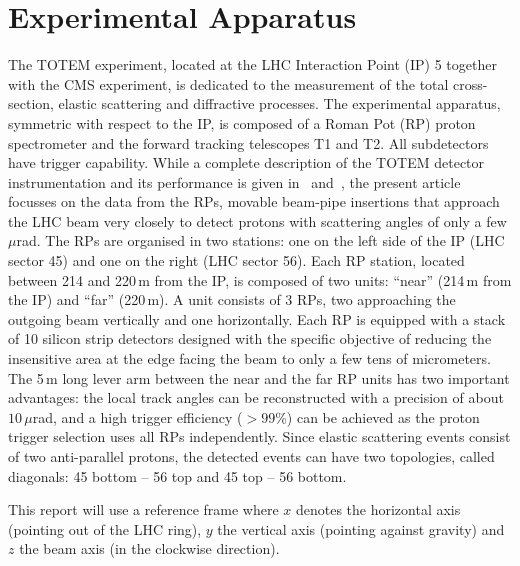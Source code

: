 \section{Experimental Apparatus}
\label{sec:exp apparatus}

The TOTEM experiment, located at the LHC Interaction Point (IP) 5 together with
the CMS experiment, is dedicated to the measurement of the total 
cross-section, elastic scattering
and diffractive processes. The experimental
apparatus, symmetric with respect to the IP, is 
composed of a Roman Pot (RP) proton spectrometer and the forward tracking 
telescopes T1 and T2. All subdetectors have trigger capability. 
While a complete description of the TOTEM detector instrumentation 
and its performance is given in~\cite{totem-jinst} and~\cite{totem-ijmp}, 
the present article focusses on the data from the RPs, movable beam-pipe
insertions that approach the LHC beam very closely to detect protons with
scattering angles of only a few $\mu$rad. 
The RPs are organised in two stations: one on the left side of the IP 
(LHC sector 45) and one on the right (LHC sector 56).
Each RP station, located between 214 and 220\,m from the IP, is composed of two 
units: ``near'' (214\,m from the IP) and ``far'' (220\,m). 
A unit consists of 3 RPs, two
approaching the outgoing beam vertically and one horizontally.
Each RP is equipped with a stack of 10 silicon
strip detectors designed with the specific objective of
reducing the insensitive area at the edge facing the beam
to only a few tens of micrometers. The 5\,m long lever arm 
between the near and the far RP units has two important
advantages: the local track angles can be reconstructed
with a precision of about $10\,\mu$rad, and a high trigger efficiency
($> 99$\%) can be achieved as the proton trigger selection
uses all RPs independently. Since elastic scattering events consist of two anti-parallel protons, the detected events can have two topologies, called diagonals: 45 bottom -- 56 top and 45 top -- 56 bottom.

This report will use a reference frame where $x$ denotes the horizontal axis (pointing out of the LHC ring), $y$ the vertical axis (pointing against gravity) and $z$ the beam axis (in the clockwise direction).
